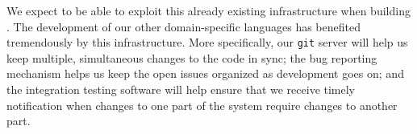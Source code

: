 We expect to be able to exploit this already existing infrastructure when
building \poppl{}. The development of our other domain-specific
languages has benefited tremendously by this infrastructure. More
specifically, our \texttt{git} server will help us keep multiple,
simultaneous changes to the code in sync; the bug reporting mechanism
helps us keep the open issues organized as development goes on; and
the integration testing software will help ensure that we receive
timely notification when changes to one part of the system require
changes to another part.

